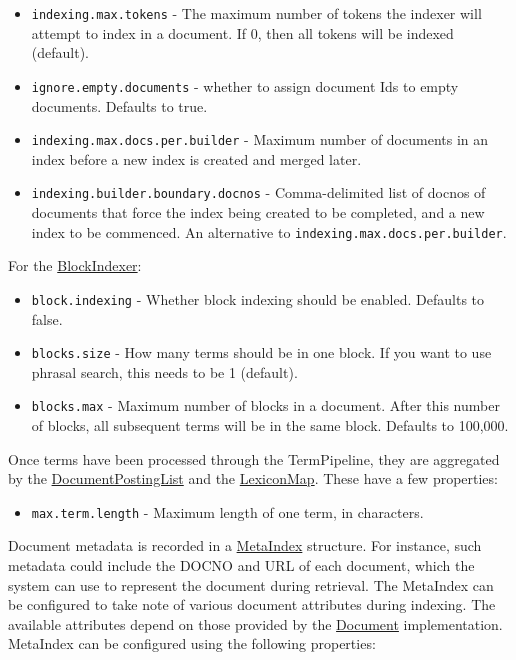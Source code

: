 \begin{itemize}
\tightlist
\item
  \texttt{indexing.max.tokens} - The maximum number of tokens the
  indexer will attempt to index in a document. If 0, then all tokens
  will be indexed (default).
\item
  \texttt{ignore.empty.documents} - whether to assign document Ids to
  empty documents. Defaults to true.
\item
  \texttt{indexing.max.docs.per.builder} - Maximum number of documents
  in an index before a new index is created and merged later.
\item
  \texttt{indexing.builder.boundary.docnos} - Comma-delimited list of
  docnos of documents that force the index being created to be
  completed, and a new index to be commenced. An alternative to
  \texttt{indexing.max.docs.per.builder}.
\end{itemize}

For the
\href{javadoc/org/terrier/structures/indexing/classical/BlockIndexer.html}{BlockIndexer}:

\begin{itemize}
\tightlist
\item
  \texttt{block.indexing} - Whether block indexing should be enabled.
  Defaults to false.
\item
  \texttt{blocks.size} - How many terms should be in one block. If you
  want to use phrasal search, this needs to be 1 (default).
\item
  \texttt{blocks.max} - Maximum number of blocks in a document. After
  this number of blocks, all subsequent terms will be in the same block.
  Defaults to 100,000.
\end{itemize}

Once terms have been processed through the TermPipeline, they are
aggregated by the
\href{javadoc/org/terrier/structures/indexing/DocumentPostingList.html}{DocumentPostingList}
and the
\href{javadoc/org/terrier/structures/indexing/LexiconMap.html}{LexiconMap}.
These have a few properties:

\begin{itemize}
\tightlist
\item
  \texttt{max.term.length} - Maximum length of one term, in characters.
\end{itemize}

Document metadata is recorded in a
\href{javadoc/org/terrier/structures/MetaIndex.html}{MetaIndex}
structure. For instance, such metadata could include the DOCNO and URL
of each document, which the system can use to represent the document
during retrieval. The MetaIndex can be configured to take note of
various document attributes during indexing. The available attributes
depend on those provided by the
\href{javadoc/org/terrier/indexing/Document.html}{Document}
implementation. MetaIndex can be configured using the following
properties:

